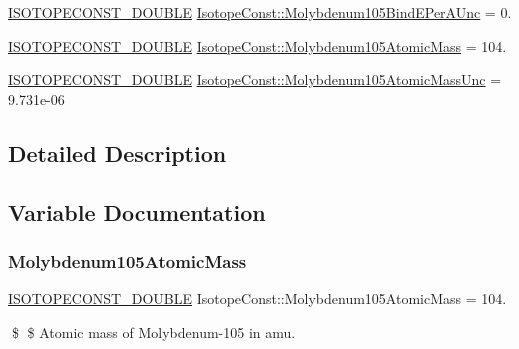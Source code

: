 \begin{DoxyCompactItemize}
\item 
\mbox{\hyperlink{group___isotope_const-_macros_ga8f45a7272ce02c0b4c65c44636ed719a}{I\+S\+O\+T\+O\+P\+E\+C\+O\+N\+S\+T\+\_\+\+D\+O\+U\+B\+LE}} \mbox{\hyperlink{group___isotope_const-_molybdenum-_mo105_gac8f748b9881d719cbfd5a2a3fc0d475c}{Isotope\+Const\+::\+Molybdenum105\+Bind\+E\+Per\+A\+Unc}} = 0.
\item 
\mbox{\hyperlink{group___isotope_const-_macros_ga8f45a7272ce02c0b4c65c44636ed719a}{I\+S\+O\+T\+O\+P\+E\+C\+O\+N\+S\+T\+\_\+\+D\+O\+U\+B\+LE}} \mbox{\hyperlink{group___isotope_const-_molybdenum-_mo105_ga8e6c56f85f0c5030db9c3f8af3db192e}{Isotope\+Const\+::\+Molybdenum105\+Atomic\+Mass}} = 104.
\item 
\mbox{\hyperlink{group___isotope_const-_macros_ga8f45a7272ce02c0b4c65c44636ed719a}{I\+S\+O\+T\+O\+P\+E\+C\+O\+N\+S\+T\+\_\+\+D\+O\+U\+B\+LE}} \mbox{\hyperlink{group___isotope_const-_molybdenum-_mo105_ga34a9293880e87d1a44d5ee06fb5653be}{Isotope\+Const\+::\+Molybdenum105\+Atomic\+Mass\+Unc}} = 9.\+731e-\/06
\end{DoxyCompactItemize}


\subsection{Detailed Description}


\subsection{Variable Documentation}
\mbox{\label{group___isotope_const-_molybdenum-_mo105_ga8e6c56f85f0c5030db9c3f8af3db192e}} 
\subsubsection{\texorpdfstring{Molybdenum105\+Atomic\+Mass}{Molybdenum105AtomicMass}}
{\footnotesize\ttfamily \mbox{\hyperlink{group___isotope_const-_macros_ga8f45a7272ce02c0b4c65c44636ed719a}{I\+S\+O\+T\+O\+P\+E\+C\+O\+N\+S\+T\+\_\+\+D\+O\+U\+B\+LE}} Isotope\+Const\+::\+Molybdenum105\+Atomic\+Mass = 104.}

\$ \$ Atomic mass of Molybdenum-\/105 in amu. \mbox{\label{group___isotope_const-_molybdenum-_mo105_ga34a9293880e87d1a44d5ee06fb5653be}} 
